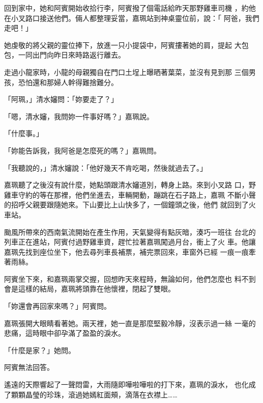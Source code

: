 回到家中，她和阿賓開始收拾行李，阿賓撥了個電話給昨天那野雞車司機
，約他在小叉路口接送他們。倆人都整理妥當，嘉珮站到神桌靈位前，說：「
阿爸，我們走吧！」

她虔敬的將父親的靈位捧下，放進一只小提袋中，阿賓摟著她的肩，提起
大包包，一同出門向昨日來時路返行離去。

走過小龍家時，小龍的母親獨自在門口土埕上曝晒著葉菜，並沒有見到那
三個男孩，恐怕還和那婦人幹得難捨難分。

「阿珮，」清水嬸問：「妳要走了？」

「嗯，清水嬸，我問妳一件事好嗎？」嘉珮說。

「什麼事。」

「妳能告訴我，我阿爸是怎麼死的嗎？」嘉珮問。

「我聽說的，」清水嬸說：「他好幾天不肯吃喝，然後就過去了。」

嘉珮聽了之後沒有說什麼，她點頭跟清水嬸道別，轉身上路。來到小叉路
口，野雞車守約的等在那裡，他們坐進去，車輛開動，蹦跳在石子路上，嘉珮
不斷小聲的招呼父親要跟隨她來。下山要比上山快多了，一個鐘頭之後，他們
就回到了火車站。

颱風所帶來的西南氣流開始在產生作用，天氣變得有點灰暗，湊巧一班往
台北的列車正在進站，阿賓付過野雞車資，趕忙拉著嘉珮闖過月台，衝上了火
車。他讓嘉珮先找到座位坐下，他去尋列車長補票，補完票回來，車窗外已經
一痕一痕牽著雨絲。

阿賓坐下來，和嘉珮兩掌交握，回想昨天來程時，無論如何，他們怎麼也
料不到會是這樣的結局，嘉珮將頭靠在他懷裡，閉起了雙眼。

「妳還會再回家來嗎？」阿賓問。

嘉珮張開大眼睛看著她。兩天裡，她一直是那麼堅毅冷靜，沒表示過一絲
一毫的悲痛，這時眼中卻孕滿了盈盈的淚水。

「什麼是家？」她問。

阿賓無法回答。

遙遠的天際響起了一聲悶雷，大雨隨即嘩啦嘩啦的打下來，嘉珮的淚水，
也化成了顆顆晶瑩的珍珠，滾過她嫣紅面頰，滴落在衣襟上……











